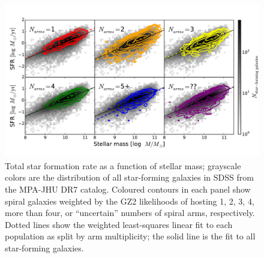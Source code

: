 \documentclass[useAMS,usenatbib]{mn2e}
\begin{document}
\begin{figure}
\includegraphics[angle=0,width=7.0in]{figures/masslim/ms_arms_number_weighted_contour.pdf}
\caption{Total star formation rate as a function of stellar mass; grayscale colors are the distribution of all star-forming galaxies in SDSS from the MPA-JHU DR7 catalog. Coloured contours in each panel show spiral galaxies weighted by the GZ2 likelihoods of hosting 1, 2, 3, 4, more than four, or ``uncertain'' numbers of spiral arms, respectively. Dotted lines show the weighted least-squares linear fit to each population as split by arm multiplicity; the solid line is the fit to all star-forming galaxies. 
\label{fig-number}}
\end{figure}
\end{document}

